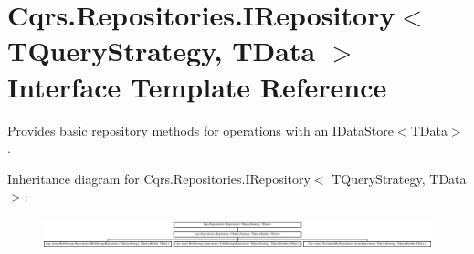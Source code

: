 \hypertarget{interfaceCqrs_1_1Repositories_1_1IRepository}{}\section{Cqrs.\+Repositories.\+I\+Repository$<$ T\+Query\+Strategy, T\+Data $>$ Interface Template Reference}
\label{interfaceCqrs_1_1Repositories_1_1IRepository}


Provides basic repository methods for operations with an I\+Data\+Store$<$\+T\+Data$>$.  


Inheritance diagram for Cqrs.\+Repositories.\+I\+Repository$<$ T\+Query\+Strategy, T\+Data $>$\+:\begin{figure}[H]
\begin{center}
\leavevmode
\includegraphics[height=0.907618cm]{interfaceCqrs_1_1Repositories_1_1IRepository}
\end{center}
\end{figure}
